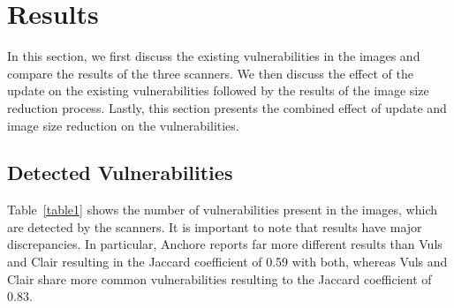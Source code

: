 \documentclass[a4paper,num-refs]{oup-contemporary}
\begin{document}

\section{Results}

In this section,
we first discuss the existing vulnerabilities in the images and compare the
results of the three scanners. We then discuss the effect of the update on the
existing vulnerabilities followed by the results of the image size reduction
process. Lastly, this section presents the combined effect of update and image size reduction on the
vulnerabilities.

\subsection{Detected Vulnerabilities}

Table~\ref{table1} shows the number of vulnerabilities present in the images,
which are detected by the scanners.
It is important to note that results have major discrepancies. In particular,
Anchore reports far more different results than Vuls and Clair resulting in 
the Jaccard coefficient of 0.59 with both,
whereas Vuls and Clair share more common vulnerabilities resulting to the Jaccard coefficient of 0.83.
\end{document}
